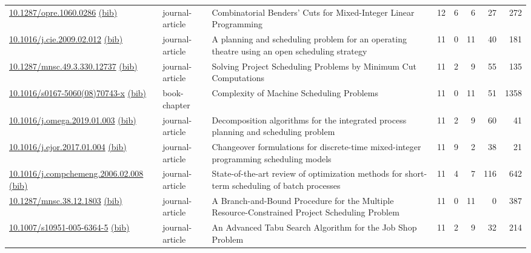{\begin{longtable}{p{5cm}lp{11cm}rrrrr}
\href{http://dx.doi.org/10.1287/opre.1060.0286}{10.1287/opre.1060.0286} \href{https://www.doi2bib.org/bib/10.1287/opre.1060.0286}{(bib)} & journal-article & Combinatorial Benders' Cuts for Mixed-Integer Linear Programming & 12 & 6 & 6 & 27 & 272 \\
\href{http://dx.doi.org/10.1016/j.cie.2009.02.012}{10.1016/j.cie.2009.02.012} \href{https://www.doi2bib.org/bib/10.1016/j.cie.2009.02.012}{(bib)} & journal-article & A planning and scheduling problem for an operating theatre using an open scheduling strategy & 11 & 0 & 11 & 40 & 181 \\
\href{http://dx.doi.org/10.1287/mnsc.49.3.330.12737}{10.1287/mnsc.49.3.330.12737} \href{https://www.doi2bib.org/bib/10.1287/mnsc.49.3.330.12737}{(bib)} & journal-article & Solving Project Scheduling Problems by Minimum Cut Computations & 11 & 2 & 9 & 55 & 135 \\
\href{http://dx.doi.org/10.1016/s0167-5060(08)70743-x}{10.1016/s0167-5060(08)70743-x} \href{https://www.doi2bib.org/bib/10.1016/s0167-5060(08)70743-x}{(bib)} & book-chapter & Complexity of Machine Scheduling Problems & 11 & 0 & 11 & 51 & 1358 \\
\href{http://dx.doi.org/10.1016/j.omega.2019.01.003}{10.1016/j.omega.2019.01.003} \href{https://www.doi2bib.org/bib/10.1016/j.omega.2019.01.003}{(bib)} & journal-article & Decomposition algorithms for the integrated process planning and scheduling problem & 11 & 2 & 9 & 60 & 41 \\
\href{http://dx.doi.org/10.1016/j.ejor.2017.01.004}{10.1016/j.ejor.2017.01.004} \href{https://www.doi2bib.org/bib/10.1016/j.ejor.2017.01.004}{(bib)} & journal-article & Changeover formulations for discrete-time mixed-integer programming scheduling models & 11 & 9 & 2 & 38 & 21 \\
\href{http://dx.doi.org/10.1016/j.compchemeng.2006.02.008}{10.1016/j.compchemeng.2006.02.008} \href{https://www.doi2bib.org/bib/10.1016/j.compchemeng.2006.02.008}{(bib)} & journal-article & State-of-the-art review of optimization methods for short-term scheduling of batch processes & 11 & 4 & 7 & 116 & 642 \\
\href{http://dx.doi.org/10.1287/mnsc.38.12.1803}{10.1287/mnsc.38.12.1803} \href{https://www.doi2bib.org/bib/10.1287/mnsc.38.12.1803}{(bib)} & journal-article & A Branch-and-Bound Procedure for the Multiple Resource-Constrained Project Scheduling Problem & 11 & 0 & 11 & 0 & 387 \\
\href{http://dx.doi.org/10.1007/s10951-005-6364-5}{10.1007/s10951-005-6364-5} \href{https://www.doi2bib.org/bib/10.1007/s10951-005-6364-5}{(bib)} & journal-article & An Advanced Tabu Search Algorithm for the Job Shop Problem & 11 & 2 & 9 & 32 & 214 \\

\end{longtable}}
